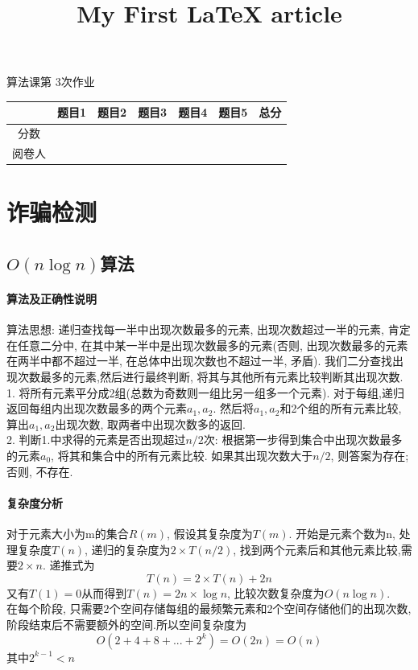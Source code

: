 \documentclass[a4paper,10pt]{article}
\title{My First \LaTeX{} article}
\begin{document}
\begin{center}
\LARGE 算法课第 3次作业
~\\
\end{center}

\begin{center}
 \begin{tabular}{|c|c|c|c|c|c|c|}
\hline
      & 题目1 & 题目2 & 题目3 & 题目4 & 题目5 & 总分\\ \hline
 \multirow{2}{*}{分数} &\multirow{2}{*}{} &\multirow{2}{*}{} &\multirow{2}{*}{} &\multirow{2}{*}{} &\multirow{2}{*}{} &\multirow{2}{*}{}\\
 & & & & & & \\ \hline
 \multirow{2}{*}{阅卷人} &\multirow{2}{*}{} &\multirow{2}{*}{} &\multirow{2}{*}{} &\multirow{2}{*}{} &\multirow{2}{*}{} &\multirow{2}{*}{}\\
 & & & & & &  \\ \hline
\end{tabular}
\end{center}
\vspace{20pt}
\section{诈骗检测}
  \normalsize
  \subsection{$O(n\log n)$算法}

  \paragraph{算法及正确性说明}算法思想: 递归查找每一半中出现次数最多的元素, 出现次数超过一半的元素, 肯定在任意二分中, 在其中某一半中是出现次数最多的元素(否则, 出现次数最多的元素在两半中都不超过一半, 在总体中出现次数也不超过一半, 矛盾). 我们二分查找出现次数最多的元素,然后进行最终判断, 将其与其他所有元素比较判断其出现次数.\\
  1. 将所有元素平分成2组(总数为奇数则一组比另一组多一个元素). 对于每组,递归返回每组内出现次数最多的两个元素$a_1, a_2$. 然后将$a_1, a_2$和2个组的所有元素比较, 算出$a_1, a_2$出现次数, 取两者中出现次数多的返回. \\
  2. 判断1.中求得的元素是否出现超过$n/2$次: 根据第一步得到集合中出现次数最多的元素$a_0$, 将其和集合中的所有元素比较. 如果其出现次数大于$n/2$, 则答案为存在; 否则, 不存在.
  \paragraph{复杂度分析}对于元素大小为m的集合$R(m)$, 假设其复杂度为$T(m)$. 开始是元素个数为n, 处理复杂度$T(n)$, 递归的复杂度为$2\times T(n/2)$, 找到两个元素后和其他元素比较,需要$2\times n$. 递推式为 
  $$T(n)=2\times T(n) + 2n$$
  又有$T(1) = 0$从而得到$T(n)=2n\times\log n$, 比较次数复杂度为$O(n\log n)$. \\
  在每个阶段, 只需要2个空间存储每组的最频繁元素和2个空间存储他们的出现次数,阶段结束后不需要额外的空间.所以空间复杂度为
  $$O(2+4+8+...+2^k)=O(2n)=O(n)$$
  其中$2^{k-1}<n$
  
\end{document}
